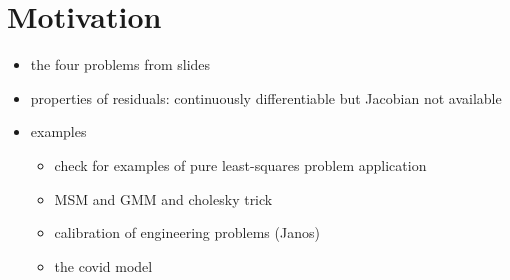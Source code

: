 
\section{Motivation}

\begin{itemize}
    \item the four problems from slides
    \item properties of residuals: continuously differentiable but Jacobian not available
    \item examples
        \begin{itemize}
            \item check for examples of pure least-squares problem application
            \item MSM and GMM and cholesky trick
            \item calibration of engineering problems (Janos)
            \item the covid model
        \end{itemize}
\end{itemize}
